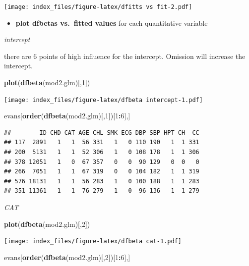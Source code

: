 \documentclass[
]{article}
\newenvironment{Shaded}{\begin{snugshade}}{\end{snugshade}}
\newcommand{\DecValTok}[1]{\textcolor[rgb]{0.00,0.00,0.81}{#1}}
\newcommand{\KeywordTok}[1]{\textcolor[rgb]{0.13,0.29,0.53}{\textbf{#1}}}
\newcommand{\NormalTok}[1]{#1}
\newcommand{\OperatorTok}[1]{\textcolor[rgb]{0.81,0.36,0.00}{\textbf{#1}}}
\providecommand{\tightlist}{%
  \setlength{\itemsep}{0pt}\setlength{\parskip}{0pt}}
\begin{document}
\texttt{[image: index\_files/figure-latex/dfitts vs fit-2.pdf]}

\begin{itemize}
\tightlist
\item
  \textbf{plot dfbetas vs.~fitted values} for each quantitative variable
\end{itemize}

\emph{intercept}

there are 6 points of high influence for the intercept. Omission will
increase the intercept.

\begin{Shaded}
\begin{Highlighting}[]
\KeywordTok{plot}\NormalTok{(}\KeywordTok{dfbeta}\NormalTok{(mod2.glm)[,}\DecValTok{1}\NormalTok{])}
\end{Highlighting}
\end{Shaded}

\texttt{[image: index\_files/figure-latex/dfbeta intercept-1.pdf]}

\begin{Shaded}
\begin{Highlighting}[]
\NormalTok{evans[}\KeywordTok{order}\NormalTok{(}\KeywordTok{dfbeta}\NormalTok{(mod2.glm)[,}\DecValTok{1}\NormalTok{])[}\DecValTok{1}\OperatorTok{:}\DecValTok{6}\NormalTok{],]}
\end{Highlighting}
\end{Shaded}

\begin{verbatim}
##        ID CHD CAT AGE CHL SMK ECG DBP SBP HPT CH  CC
## 117  2891   1   1  56 331   1   0 110 190   1  1 331
## 200  5131   1   1  52 306   1   0 108 178   1  1 306
## 378 12051   1   0  67 357   0   0  90 129   0  0   0
## 266  7051   1   1  67 319   0   0 104 182   1  1 319
## 576 18131   1   1  56 283   1   0 100 188   1  1 283
## 351 11361   1   1  76 279   1   0  96 136   1  1 279
\end{verbatim}

\emph{CAT}

\begin{Shaded}
\begin{Highlighting}[]
\KeywordTok{plot}\NormalTok{(}\KeywordTok{dfbeta}\NormalTok{(mod2.glm)[,}\DecValTok{2}\NormalTok{])}
\end{Highlighting}
\end{Shaded}

\texttt{[image: index\_files/figure-latex/dfbeta cat-1.pdf]}

\begin{Shaded}
\begin{Highlighting}[]
\NormalTok{evans[}\KeywordTok{order}\NormalTok{(}\KeywordTok{dfbeta}\NormalTok{(mod2.glm)[,}\DecValTok{2}\NormalTok{])[}\DecValTok{1}\OperatorTok{:}\DecValTok{6}\NormalTok{],]}
\end{Highlighting}
\end{Shaded}
\end{document}
